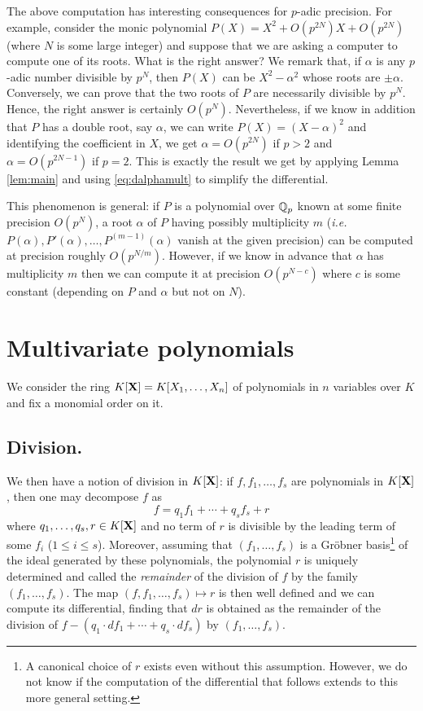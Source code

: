 \documentclass{sig-alternate}
\begin{document}
{The above computation has interesting consequences for $p$-adic 
precision. For example, consider the monic 
polynomial $P(X) = X^2 + O(p^{2N}) X + O(p^{2N})$ (where $N$ is some 
large integer) and suppose that we are asking a computer to compute one 
of its roots. What is the right answer? We remark that, if $\alpha$ is 
any $p$-adic number divisible by $p^N$, then $P(X)$ can be $X^2 - 
\alpha^2$ whose roots are $\pm \alpha$. Conversely, we can prove that 
the two roots of $P$ are necessarily divisible by $p^N$. Hence, the
right answer is certainly $O(p^N)$. Nevertheless, if we know in addition 
that $P$ has a double root, say $\alpha$, we can write $P(X) = (X - 
\alpha)^2$ and identifying the coefficient in $X$, we get $\alpha =
O(p^{2N})$ if $p > 2$ and $\alpha = O(p^{2N-1})$ if $p=2$.
This is exactly the result we get by applying Lemma \ref{lem:main} and
using \eqref{eq:dalphamult} to simplify the differential.

This phenomenon is general: if $P$ is a polynomial over $\mathbb Q_p$ known at 
some finite precision $O(p^N)$, a root $\alpha$ of $P$ having possibly 
multiplicity $m$ (\emph{i.e.} $P(\alpha), P'(\alpha), \ldots, P^{(m-1)} 
(\alpha)$ vanish at the given precision) can be computed at precision 
roughly $O(p^{N/m})$. However, if we know in advance that $\alpha$ has 
multiplicity $m$ then we can compute it at precision $O(p^{N-c})$ 
where $c$ is some constant (depending on $P$ and $\alpha$ but not on
$N$).

\section{Multivariate polynomials}

We consider the ring $K[\mathbf X] = K[X_1, \ldots, X_n]$ of polynomials in $n$
variables over $K$ and fix a monomial order on it. 

\subsection*{Division.}

We then have a notion of division in $K[\mathbf X]$: if $f, f_1, \ldots, f_s$ 
are polynomials in $K[\mathbf X]$, then one may decompose $f$ as
$$f = q_1 f_1 + \cdots + q_s f_s + r$$
where $q_1, \ldots, q_s, r \in K[\mathbf X]$ and no term of $r$ is divisible
by the leading term of some $f_i$ ($1 \leq i \leq s$). Moreover, assuming
that $(f_1, \ldots, f_s)$ is a Gr\"obner basis\footnote{A canonical choice of $r$ exists even without this
assumption. However, we do not know
if the computation of the differential that follows extends to this more
general setting.} of the ideal generated by these polynomials, the 
polynomial $r$ is uniquely determined and called the \emph{remainder} of 
the division of $f$ by the family $(f_1, \ldots, f_s)$. The map 
$(f, f_1, \ldots, f_s) \mapsto r$ is then well defined and we can compute its differential,
finding that $dr$ is obtained as the remainder of the division of $f - (q_1 
\cdot d f_1 + \cdots + q_s \cdot d f_s)$ by $(f_1, \ldots, f_s)$.

}
\end{document}
